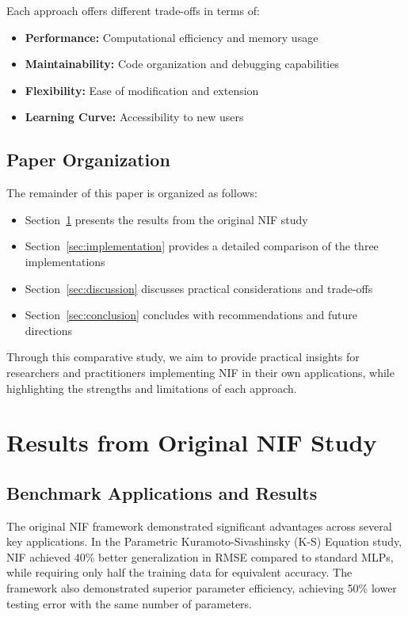 \documentclass[10pt,journal,compsoc,onecolumn]{IEEEtran}
\begin{document}
Each approach offers different trade-offs in terms of:

\begin{itemize}
    \item \textbf{Performance:} Computational efficiency and memory usage
    \item \textbf{Maintainability:} Code organization and debugging capabilities
    \item \textbf{Flexibility:} Ease of modification and extension
    \item \textbf{Learning Curve:} Accessibility to new users
\end{itemize}

\subsection{Paper Organization}
The remainder of this paper is organized as follows:

\begin{itemize}
    \item Section~\ref{sec:original_results} presents the results from the original NIF study
    \item Section~\ref{sec:implementation} provides a detailed comparison of the three implementations
    \item Section~\ref{sec:discussion} discusses practical considerations and trade-offs
    \item Section~\ref{sec:conclusion} concludes with recommendations and future directions
\end{itemize}

Through this comparative study, we aim to provide practical insights for researchers and practitioners implementing NIF in their own applications, while highlighting the strengths and limitations of each approach.

\section{Results from Original NIF Study}\label{sec:original_results}
\subsection{Benchmark Applications and Results}
The original NIF framework demonstrated significant advantages across several key applications. In the Parametric Kuramoto-Sivashinsky (K-S) Equation study, NIF achieved 40\% better generalization in RMSE compared to standard MLPs, while requiring only half the training data for equivalent accuracy. The framework also demonstrated superior parameter efficiency, achieving 50\% lower testing error with the same number of parameters.
\end{document}
